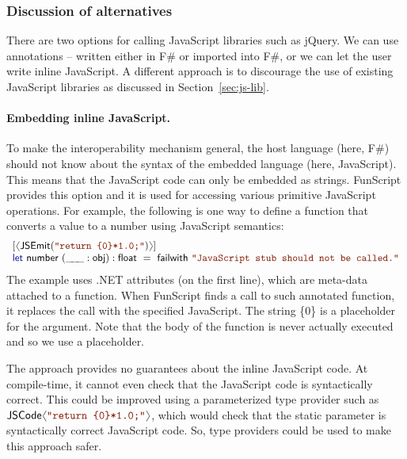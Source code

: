 \documentclass[submission,copyright,creativecommons]{eptcs}
\newcommand{\langl}{\begin{picture}(4.5,7)
\put(1.1,2.5){\rotatebox{60}{\line(1,0){5.5}}}
\put(1.1,2.5){\rotatebox{300}{\line(1,0){5.5}}}
\end{picture}}
\newcommand{\rangl}{\begin{picture}(4.5,7)
\put(.9,2.5){\rotatebox{120}{\line(1,0){5.5}}}
\put(.9,2.5){\rotatebox{240}{\line(1,0){5.5}}}
\end{picture}}
\newcommand{\ignp}{\_\kern-.5ex\_\kern-.5ex\_ }
\newcommand{\kvd}[1]{\textnormal{\textcolor{kvdclr}{\sffamily #1}}}
\newcommand{\str}[1]{\textnormal{\textcolor{strclr}{\ttfamily "#1"}}}
\newcommand{\ident}[1]{\textnormal{\sffamily #1}}
\begin{document}
\subsubsection{Discussion of alternatives}
There are two options for calling JavaScript libraries such as jQuery. We can use annotations
-- written either in F\# or imported into F\#, or we can let the user write inline JavaScript. 
A different approach is to discourage the use of existing JavaScript libraries as discussed in 
Section~\ref{sec:js-lib}.

\vspace{-1em}
\paragraph{Embedding inline JavaScript.}
To make the interoperability mechanism general, the host language (here, F\#) should not know about 
the syntax of the embedded language (here, JavaScript). This means that the JavaScript code can
only be embedded as strings. FunScript provides this option and it is used for accessing various
primitive JavaScript operations. For example, the following is one way to define a function that
converts a value to a number using JavaScript semantics:
%
\begin{equation*}
\begin{array}{l}
 \lbrack\langl\ident{JSEmit}(\str{return \{0\}*1.0;})\rangl\rbrack \\
 \kvd{let}~\ident{number}~(\ignp:\ident{obj}) : \ident{float} ~=~\ident{failwith}~\str{JavaScript stub should not be called.}
\end{array}
\end{equation*}
%
The example uses .NET attributes (on the first line), which are meta-data attached to a function.
When FunScript finds a call to such annotated function, it replaces the call with the specified 
JavaScript. The string \textcolor{strclr}{\ttfamily \{0\}} is a placeholder for the argument. Note
that the body of the function is never actually executed and so we use a placeholder.

The approach provides no guarantees about the inline JavaScript code. At compile-time, it cannot
even check that the JavaScript code is syntactically correct. This could be improved using a 
parameterized type provider such as $\ident{JSCode}\langl\str{return \{0\}*1.0;}\rangl$, which 
would check that the static parameter is syntactically correct JavaScript code. So, type providers
could be used to make this approach safer. 
\end{document}
